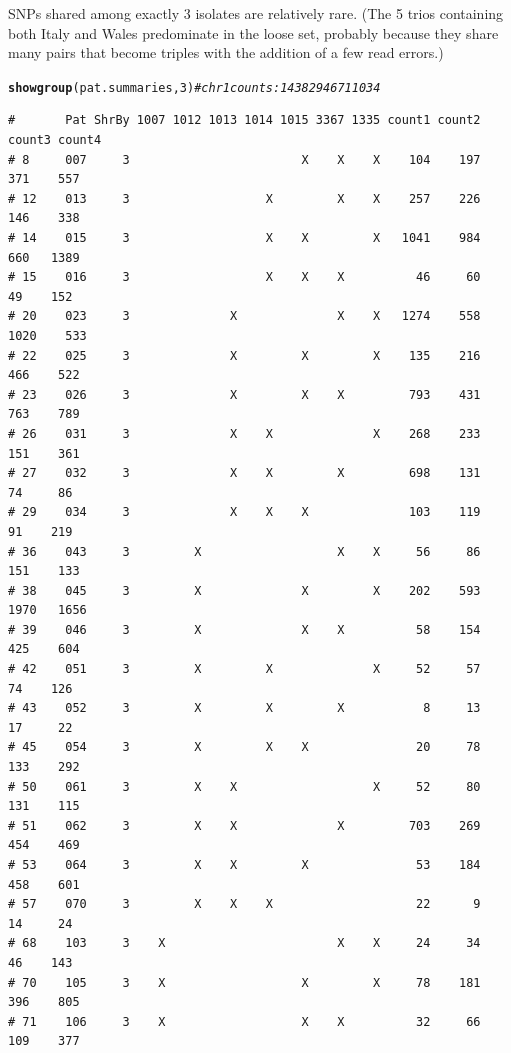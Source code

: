 \documentclass{article}\usepackage[]{graphicx}\usepackage[]{color}
\makeatletter
\newcommand{\hlnum}[1]{\textcolor[rgb]{0.686,0.059,0.569}{#1}}%
\newcommand{\hlcom}[1]{\textcolor[rgb]{0.678,0.584,0.686}{\textit{#1}}}%
\newcommand{\hlstd}[1]{\textcolor[rgb]{0.345,0.345,0.345}{#1}}%
\newcommand{\hlkwd}[1]{\textcolor[rgb]{0.737,0.353,0.396}{\textbf{#1}}}%
\newenvironment{kframe}{%
 \def\at@end@of@kframe{}%
 \ifinner\ifhmode%
  \def\at@end@of@kframe{\end{minipage}}%
  \begin{minipage}{\columnwidth}%
 \fi\fi%
 \def\FrameCommand##1{\hskip\@totalleftmargin \hskip-\fboxsep
 \colorbox{shadecolor}{##1}\hskip-\fboxsep
     \hskip-\linewidth \hskip-\@totalleftmargin \hskip\columnwidth}%
 \MakeFramed {\advance\hsize-\width
   \@totalleftmargin\z@ \linewidth\hsize
   \@setminipage}}%
 {\par\unskip\endMakeFramed%
 \at@end@of@kframe}
\newenvironment{knitrout}{}{} %
\makeatother
\begin{document}
SNPs shared among exactly 3 isolates are relatively rare.  (The 5 trios containing both Italy and Wales predominate in
the loose set, probably because they share many pairs that become triples with the addition of a few read errors.)

\begin{knitrout}\footnotesize
{}\color{fgcolor}\begin{kframe}
\begin{alltt}
\hlkwd{showgroup}\hlstd{(pat.summaries,}\hlnum{3}\hlstd{)} \hlcom{# chr 1 counts: 1438    294    671  1034}
\end{alltt}
\begin{verbatim}
#       Pat ShrBy 1007 1012 1013 1014 1015 3367 1335 count1 count2 count3 count4
# 8     007     3                        X    X    X    104    197    371    557
# 12    013     3                   X         X    X    257    226    146    338
# 14    015     3                   X    X         X   1041    984    660   1389
# 15    016     3                   X    X    X          46     60     49    152
# 20    023     3              X              X    X   1274    558   1020    533
# 22    025     3              X         X         X    135    216    466    522
# 23    026     3              X         X    X         793    431    763    789
# 26    031     3              X    X              X    268    233    151    361
# 27    032     3              X    X         X         698    131     74     86
# 29    034     3              X    X    X              103    119     91    219
# 36    043     3         X                   X    X     56     86    151    133
# 38    045     3         X              X         X    202    593   1970   1656
# 39    046     3         X              X    X          58    154    425    604
# 42    051     3         X         X              X     52     57     74    126
# 43    052     3         X         X         X           8     13     17     22
# 45    054     3         X         X    X               20     78    133    292
# 50    061     3         X    X                   X     52     80    131    115
# 51    062     3         X    X              X         703    269    454    469
# 53    064     3         X    X         X               53    184    458    601
# 57    070     3         X    X    X                    22      9     14     24
# 68    103     3    X                        X    X     24     34     46    143
# 70    105     3    X                   X         X     78    181    396    805
# 71    106     3    X                   X    X          32     66    109    377

\end{verbatim}
\end{kframe}
\end{knitrout}
\end{document}

